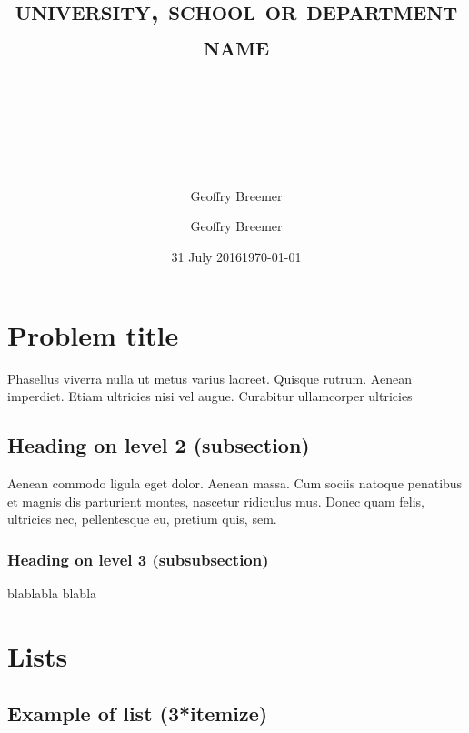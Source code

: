 \documentclass[a4paper, fontsize=12pt]{scrartcl} %
\author{Geoffry Breemer}
\date{31 July 2016}
\title{	
\normalfont \normalsize 
\textsc{university, school or department name} \\ [25pt] %
\horrule{0.5pt} \\[0.4cm] %
\huge \usqtitle \\ %
\horrule{2pt} \\[0.5cm] %
}
\author{Geoffry Breemer} %
\date{\normalsize\today} %
\begin{document}
\maketitle %

\section{Problem title}
Phasellus viverra nulla ut metus varius laoreet. Quisque rutrum. Aenean imperdiet. Etiam ultricies nisi vel augue. Curabitur ullamcorper ultricies

\subsection{Heading on level 2 (subsection)}
Aenean commodo ligula eget dolor. Aenean massa. Cum sociis natoque penatibus et magnis dis parturient montes, nascetur ridiculus mus. Donec quam felis, ultricies nec, pellentesque eu, pretium quis, sem.

\subsubsection{Heading on level 3 (subsubsection)}
blablabla blabla

\section{Lists}

\subsection{Example of list (3*itemize)}
\end{document}
